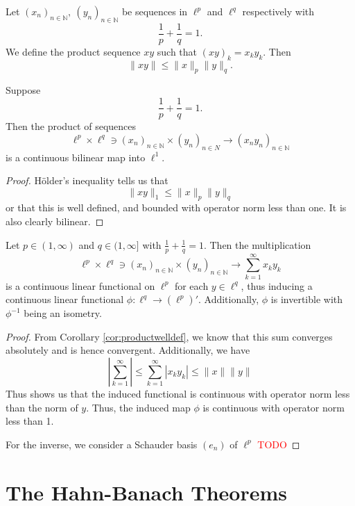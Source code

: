 \documentclass[twoside,symmetric, openany, 12pt]{./tuftebook}
\theoremstyle{definition}
\theoremstyle{definition}
\theoremstyle{definition}
\newcommand{\N}{\mathbb{N}}
\begin{document}
\begin{Theorem}
	Let $(x_n)_{n\in \N},~(y_n)_{n\in \N}$ be sequences in $\ell^p$ and $\ell^q$ respectively with
	\[\frac 1p + \frac 1q = 1.\]
	We define the product sequence $xy$ such that $(xy)_k = x_k y_k$. Then
	\[\|xy\| \le \|x\|_p \|y\|_q.\]
\end{Theorem}
\begin{Corollary}\label{cor:productwelldef}
	Suppose
	\[\frac 1p + \frac 1q = 1.\]
	Then the product of sequences
	\[\ell^p \times \ell^q\ni (x_n)_{n\in \N}\times (y_n)_{n\in N} \to (x_ny_n)_{n\in \N}\]
	is a continuous bilinear map into $\ell^1$.
\end{Corollary}
\begin{proof}
Hölder's inequality tells us that
\[\|xy\|_1 \le \|x\|_p \|y\|_q\]
or that this is well defined, and bounded with operator norm less than one. It is also clearly bilinear.
\end{proof}
\begin{Example}[$(\ell^p)' =\ell^q$]
	Let $p\in (1,\infty)$ and $q\in (1,\infty]$ with $\frac 1p + \frac 1q = 1$. Then the multiplication
	\[\ell^p \times \ell^q \ni (x_n)_{n\in \N} \times (y_n)_{n\in \N} \to \sum_{k=1}^\infty x_k y_k\]
	is a continuous linear functional on $\ell^p$ for each $y\in \ell^q$, thus inducing a continuous linear functional $\phi:\ell^q \to (\ell^p)'$. Additionally, $\phi$ is invertible with $\phi^{-1}$ being an isometry.
\end{Example}
\begin{proof}
	From Corollary \ref{cor:productwelldef}, we know that this sum converges absolutely and is hence convergent. Additionally, we have
	\[\left| \sum_{k=1}^\infty \right| \le \sum_{k=1}^\infty |x_k y_k| \le \|x\|\|y\|\]
	Thus shows us that the induced functional is continuous with operator norm less than the norm of $y$. Thus, the induced map $\phi$ is continuous with operator norm less than 1.
	
	For the inverse, we consider a Schauder basis $(e_n)$ of $\ell^p$ \textcolor{red}{TODO}
\end{proof}
	\section{The Hahn-Banach Theorems}
\end{document}

